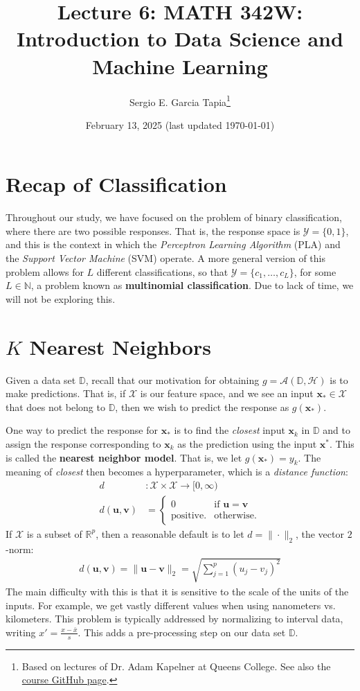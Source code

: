 \documentclass[12pt, a4paper]{article}
\title{Lecture 6: MATH 342W: Introduction to Data Science and Machine Learning}
\author{Sergio E. Garcia Tapia\thanks{Based on lectures of Dr. Adam Kapelner at Queens College.
See also the \href{https://github.com/kapelner/QC_MATH_342W_Spring_2025}{course GitHub page}.}}
\date{February 13, 2025 (last updated \today)}
\theoremstyle{definition}
\begin{document}
	\maketitle
	\section*{Recap of Classification}
	Throughout our study, we have focused on the problem of binary classification, where there
	are two possible responses. That is, the response space is $\mathcal{Y}=\{0, 1\}$,
	and this is the context in which the \emph{Perceptron Learning Algorithm} (PLA) and
	the \emph{Support Vector Machine} (SVM) operate. A more general version of this problem
	allows for $L$ different classifications, so that $\mathcal{Y}=\{c_1,\ldots,c_L\}$,
	for some $L\in\mathbb{N}$,
	a problem known as \textbf{multinomial classification}. Due to lack of time, we will
	not be exploring this.
	\section*{$K$ Nearest Neighbors}
	Given a data set $\mathbb{D}$, recall that our motivation for obtaining 
	$g=\mathcal{A}(\mathbb{D},\mathcal{H})$ is to make predictions. That is,
	if $\mathcal{X}$ is our feature space, and we see an input $\mathbf{x}_*\in \mathcal{X}$
	that does not belong to $\mathbb{D}$, then we wish to predict the response as $g(\mathbf{x}_*)$.
	
	One way to predict the response for $\mathbf{x}_*$ is to find the \emph{closest} input
	$\mathbf{x}_k$ in $\mathbb{D}$ and to assign the response corresponding to $\mathbf{x}_k$
	as the prediction using the input $\mathbf{x}^*$. This is called the \textbf{nearest neighbor model}.
	That is, we let $g(\mathbf{x}_*) = y_k$. The meaning of \emph{closest} then becomes a
	hyperparameter, which is a \emph{distance function}:
	\begin{align*}
		d&:\mathcal{X}\times \mathcal{X}\to[0, \infty)\\
		d(\mathbf{u}, \mathbf{v}) &= \begin{cases}
			0 & \text{if } \mathbf{u} = \mathbf{v}\\
			\text{positive.} & \text{otherwise.}
		\end{cases}
	\end{align*}
	If $\mathcal{X}$ is a subset of $\mathbb{R}^p$, then a reasonable default is
	to let $d=\|\cdot \|_2$, the vector $2$-norm:
	\begin{align*}
		d(\mathbf{u}, \mathbf{v})=\|\mathbf{u} - \mathbf{v}\|_2
		=\sqrt{\sum_{j=1}^{p}(u_{j} - v_{j})^2}
	\end{align*}
	The main difficulty with this is that it is sensitive to the scale of the units
	of the inputs. For example, we get vastly different values when using nanometers vs. kilometers.
	This problem is typically addressed by normalizing to interval data, writing
	$x'=\frac{x-\bar{x}}{s}$. This adds a pre-processing step on our data set $\mathbb{D}$.
	
\end{document}
